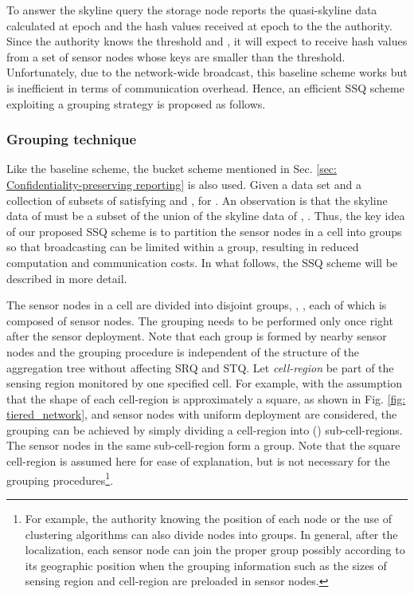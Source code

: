 \documentclass[conference]{IEEEtran}
\begin{document}
To answer the skyline query  the storage node reports the quasi-skyline data calculated at epoch  and the hash values received at epoch  to the the authority. Since the authority knows the threshold and  , it will expect to receive hash values from a set of sensor nodes whose keys are smaller than the threshold. Unfortunately, due to the network-wide broadcast, this baseline scheme works but is inefficient in terms of communication overhead. Hence, an efficient SSQ scheme exploiting a grouping strategy is proposed as follows.

\subsubsection{Grouping technique}\label{sec: Grouping technique}
Like the baseline scheme, the bucket scheme mentioned in Sec. \ref{sec: Confidentiality-preserving reporting} is also used. Given a data set  and a collection  of subsets of  satisfying  and ,  for . An observation is that the skyline data of  must be a subset of the union of the skyline data of , . Thus, the key idea of our proposed SSQ scheme is to partition the sensor nodes in a cell into groups so that broadcasting can be limited within a group, resulting in reduced computation and communication costs. In what follows, the SSQ scheme will be described in more detail.

The sensor nodes in a cell are divided into  disjoint groups, , , each of which is composed of  sensor nodes. The grouping needs to be performed only once right after the sensor deployment. Note that each group is formed by nearby sensor nodes and the grouping procedure is independent of the structure of the aggregation tree without affecting SRQ and STQ. Let \emph{cell-region} be part of the sensing region monitored by one specified cell. For example, with the assumption that the shape of each cell-region is approximately a square, as shown in Fig. \ref{fig: tiered_network}, and sensor nodes with uniform deployment are considered, the grouping can be achieved by simply dividing a cell-region into  () sub-cell-regions. The sensor nodes in the same sub-cell-region form a group. Note that the square cell-region is assumed here for ease of explanation, but is not necessary for the grouping procedures\footnote{For example, the authority knowing the position of each node or the use of clustering algorithms can also divide nodes into groups. In general, after the localization, each sensor node can join the proper group possibly according to its geographic position when the grouping information such as the sizes of sensing region and cell-region are preloaded in sensor nodes.}.
\end{document}

